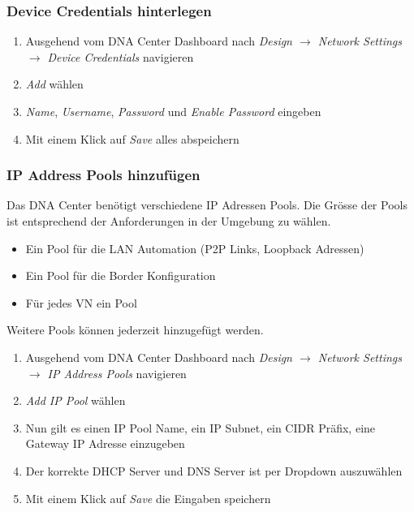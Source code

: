 \subsubsection{Device Credentials hinterlegen}
\begin{enumerate}
	\item Ausgehend vom DNA Center Dashboard nach \textit{Design $\rightarrow$ Network Settings $\rightarrow$ Device Credentials} navigieren
	\item \textit{Add} wählen
	\item \textit{Name}, \textit{Username}, \textit{Password} und \textit{Enable Password} eingeben
	\item Mit einem Klick auf \textit{Save} alles abspeichern
\end{enumerate}

\subsubsection{IP Address Pools hinzufügen}
Das DNA Center benötigt verschiedene IP Adressen Pools. Die Grösse der Pools ist entsprechend der Anforderungen in der Umgebung zu wählen.
\begin{itemize}
	\item Ein Pool für die LAN Automation (P2P Links, Loopback Adressen)
	\item Ein Pool für die Border Konfiguration
	\item Für jedes VN ein Pool
\end{itemize}

Weitere Pools können jederzeit hinzugefügt werden.

\begin{enumerate}
	\item Ausgehend vom DNA Center Dashboard nach \textit{Design $\rightarrow$ Network Settings $\rightarrow$ IP Address Pools} navigieren
	\item \textit{Add IP Pool} wählen
	\item Nun gilt es einen IP Pool Name, ein IP Subnet, ein CIDR Präfix, eine Gateway IP Adresse einzugeben
	\item Der korrekte DHCP Server und DNS Server ist per Dropdown auszuwählen
	\item Mit einem Klick auf \textit{Save} die Eingaben speichern
\end{enumerate}

